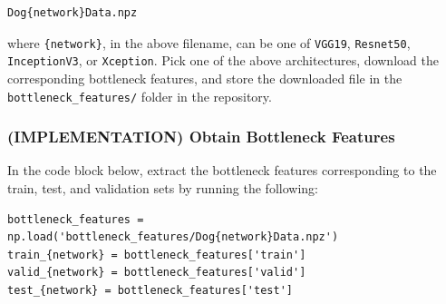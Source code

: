 \documentclass[11pt]{article}
\begin{document}
\begin{verbatim}
Dog{network}Data.npz
\end{verbatim}

where \texttt{\{network\}}, in the above filename, can be one of
\texttt{VGG19}, \texttt{Resnet50}, \texttt{InceptionV3}, or
\texttt{Xception}. Pick one of the above architectures, download the
corresponding bottleneck features, and store the downloaded file in the
\texttt{bottleneck\_features/} folder in the repository.

\hypertarget{implementation-obtain-bottleneck-features}{%
\subsubsection{(IMPLEMENTATION) Obtain Bottleneck
Features}\label{implementation-obtain-bottleneck-features}}

In the code block below, extract the bottleneck features corresponding
to the train, test, and validation sets by running the following:

\begin{verbatim}
bottleneck_features = np.load('bottleneck_features/Dog{network}Data.npz')
train_{network} = bottleneck_features['train']
valid_{network} = bottleneck_features['valid']
test_{network} = bottleneck_features['test']
\end{verbatim}
\end{document}
